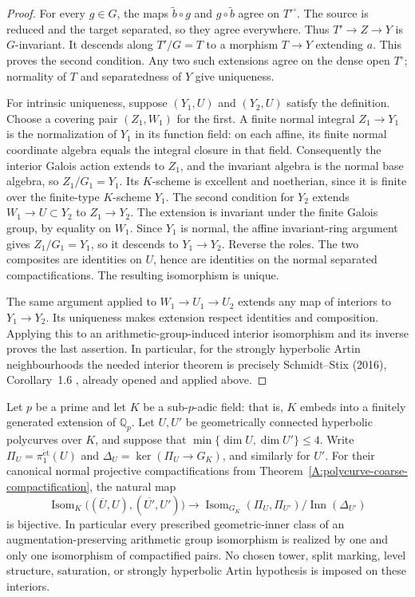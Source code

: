\begin{proof}
For every $g\in G$, the maps
$\widetilde b\circ g$ and $g\circ\widetilde b$ agree on
$T'^\circ$. The source is reduced and the target separated,
so they agree everywhere. Thus $T'\to Z\to Y$ is
$G$-invariant. It descends along $T'/G=T$ to a morphism
$T\to Y$ extending $a$. This proves the second condition.
Any two such extensions agree on the dense open $T^\circ$;
normality of $T$ and separatedness of $Y$ give uniqueness.

For intrinsic uniqueness, suppose $(Y_1,U)$ and $(Y_2,U)$
satisfy the definition. Choose a covering pair $(Z_1,W_1)$
for the first. A finite normal integral $Z_1\to Y_1$ is the
normalization of $Y_1$ in its function field: on each affine,
its finite normal coordinate algebra equals the integral
closure in that field. Consequently the interior Galois action
extends to $Z_1$, and the invariant algebra is the normal
base algebra, so $Z_1/G_1=Y_1$. Its $K$-scheme is excellent and noetherian,
since it is finite over the finite-type $K$-scheme $Y_1$.
The second condition for $Y_2$ extends $W_1\to U\subset Y_2$
to $Z_1\to Y_2$. The extension is invariant under the finite
Galois group, by equality on $W_1$. Since $Y_1$ is normal,
the affine invariant-ring argument gives $Z_1/G_1=Y_1$,
so it descends to $Y_1\to Y_2$. Reverse the roles. The
two composites are identities on $U$, hence are identities
on the normal separated compactifications. The resulting
isomorphism is unique.

The same argument applied to $W_1\to U_1\to U_2$ extends
any map of interiors to $Y_1\to Y_2$. Its uniqueness makes
extension respect identities and composition. Applying this
to an arithmetic-group-induced interior isomorphism and its
inverse proves the last assertion. In particular, for the
strongly hyperbolic Artin neighbourhoods the needed interior
theorem is precisely Schmidt--Stix (2016), Corollary~1.6
\cite{A567_SchmidtStix2016}, already opened and applied above.
\end{proof}

\begin{corollary}
\label{A:polycurve-four-dimensional-anabelian}
Let $p$ be a prime and let $K$ be a sub-$p$-adic field: that is,
$K$ embeds into a finitely generated extension of $\mathbb Q_p$.
Let $U,U'$ be geometrically connected hyperbolic polycurves over
$K$, and suppose that
$\min\{\dim U,\dim U'\}\leq4$.
Write $\Pi_U=\pi_1^{\mathrm{\acute et}}(U)$ and
$\Delta_U=\ker(\Pi_U\to G_K)$, and similarly for $U'$.
For their canonical normal projective compactifications from
Theorem~\ref{A:polycurve-coarse-compactification}, the natural map
\[
 \operatorname{Isom}_K\bigl((\overline U,U),
                         (\overline {U'},U')\bigr)
 \longrightarrow
 \operatorname{Isom}_{G_K}(\Pi_U,\Pi_{U'})/
                   \operatorname{Inn}(\Delta_{U'})
\]
is bijective. In particular every prescribed geometric-inner
class of an augmentation-preserving arithmetic group isomorphism
is realized by one and only one isomorphism of compactified pairs.
No chosen tower, split marking, level structure, saturation, or
strongly hyperbolic Artin hypothesis is imposed on these interiors.
\end{corollary}

